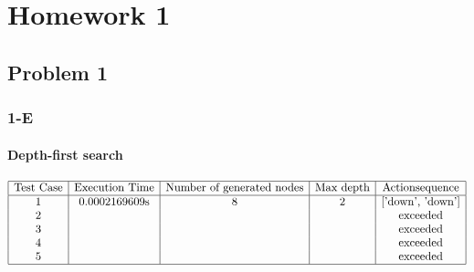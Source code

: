 \documentclass{report}
\begin{document}
    \chapter{Homework 1}
        \section{Problem 1}
            \subsection{1-E}
                \subsubsection{Depth-first search}
                    $\begin{array}{|c|c|c|c|c|}
                        \hline
                        \text{Test Case} & \text{Execution Time} & \text{Number of generated nodes} & \text{Max depth} & \text {Actionsequence}\\
                        \hline
                        \text{1} & \text{0.0002169609s} & \text{8} & \text{2} & \text {['down', 'down']}\\
                        \text{2} & \text{} & \text{} & \text{} & \text {exceeded}\\
                        \text{3} & \text{} & \text{} & \text{} & \text {exceeded}\\
                        \text{4} & \text{} & \text{} & \text{} & \text {exceeded}\\
                        \text{5} & \text{} & \text{} & \text{} & \text {exceeded}\\
                        \hline
                    \end{array}$
\end{document}
